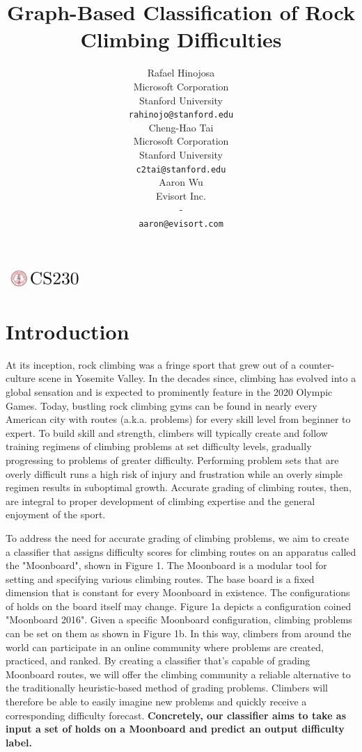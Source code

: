 \documentclass{article}
\title{Graph-Based Classification of Rock Climbing Difficulties}
\author{
  Rafael Hinojosa \\
  Microsoft Corporation \\
  Stanford University \\
  \texttt{rahinojo@stanford.edu} \\ 
  \And
  Cheng-Hao Tai \\
  Microsoft Corporation \\
  Stanford University \\
  \texttt{c2tai@stanford.edu} \\
  \And
  Aaron Wu \\
  Evisort Inc. \\
  - \\
  \texttt{aaron@evisort.com} \\
}
\begin{document}

\begin{center}
\includegraphics[width=3cm, height=0.7cm]{CS230}
\end{center}

\maketitle

\section{Introduction}	
At its inception, rock climbing was a fringe sport that grew out of a counter-culture scene in Yosemite Valley. In the decades since, climbing has evolved into a global sensation and is expected to prominently feature in the 2020 Olympic Games. Today, bustling rock climbing gyms can be found in nearly every American city with routes (a.k.a. problems) for every skill level from beginner to expert. To build skill and strength, climbers will typically create and follow training regimens of climbing problems at set difficulty levels, gradually progressing to problems of greater difficulty. Performing problem sets that are overly difficult runs a high risk of injury and frustration while an overly simple regimen results in suboptimal growth. Accurate grading of climbing routes, then, are integral to proper development of climbing expertise and the general enjoyment of the sport.

To address the need for accurate grading of climbing problems, we aim to create a classifier that assigns difficulty scores for climbing routes on an apparatus called the "Moonboard", shown in Figure 1. The Moonboard is a modular tool for setting and specifying various climbing routes. The base board is a fixed dimension that is constant for every Moonboard in existence. The configurations of holds on the board itself may change. Figure 1a depicts a configuration coined "Moonboard 2016". Given a specific Moonboard configuration, climbing problems can be set on them as shown in Figure 1b. In this way, climbers from around the world can participate in an online community where problems are created, practiced, and ranked. By creating a classifier that's capable of grading Moonboard routes, we will offer the climbing community a reliable alternative to the traditionally heuristic-based method of grading problems. Climbers will therefore be able to easily imagine new problems and quickly receive a corresponding difficulty forecast. \textbf{Concretely, our classifier aims to take as input a set of holds on a Moonboard and predict an output difficulty label.}
\end{document}
